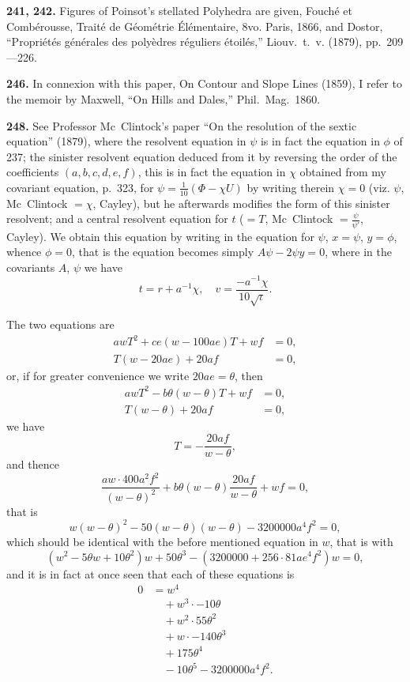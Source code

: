 \documentclass[12pt,a4paper]{article}
\theoremstyle{definition}
\begin{document}
\vspace{0.5em}

\noindent\textbf{241, 242.} Figures of Poinsot's stellated Polyhedra are given, Fouch\'{e} et Comb\'{e}rousse, Trait\'{e} de G\'{e}om\'{e}trie \'{E}l\'{e}mentaire, 8vo. Paris, 1866, and Dostor, ``Propri\'{e}t\'{e}s g\'{e}n\'{e}rales des poly\`{e}dres r\'{e}guliers \'{e}toil\'{e}s,'' Liouv.~t.~v. (1879), pp.~209---226.

\vspace{0.5em}

\noindent\textbf{246.} In connexion with this paper, On Contour and Slope Lines (1859), I refer to the memoir by Maxwell, ``On Hills and Dales,'' Phil.~Mag.~1860.

\vspace{0.5em}

\noindent\textbf{248.} See Professor Mc~Clintock's paper ``On the resolution of the sextic equation'' (1879), where the resolvent equation in $\psi$ is in fact the equation in $\phi$ of 237; the sinister resolvent equation deduced from it by reversing the order of the coefficients $(a, b, c, d, e, f)$, this is in fact the equation in $\chi$ obtained from my covariant equation, p.~323, for $\psi = \frac{1}{10}(\Phi - \chi U)$ by writing therein $\chi = 0$ (viz. $\psi$, Mc~Clintock $= \chi$, Cayley), but he afterwards modifies the form of this sinister resolvent; and a central resolvent equation for $t$ ($= T$, Mc~Clintock $= \frac{\psi}{\psi'}$, Cayley). We obtain this equation by writing in the equation for $\psi$, $x = \psi$, $y = \phi$, whence $\phi = 0$, that is the equation becomes simply $A\psi - 2\psi y = 0$, where in the covariants $A$, $\psi$ we have
\[
t = r + a^{-1}\chi,\quad v = \frac{-a^{-1}\chi}{10\sqrt{\iota}}.
\]

The two equations are
\begin{align*}
awT^2 + ce(w - 100 ae) T + wf &=  0,\\
T(w - 20 ae) + 20 af &= 0,
\end{align*}
or, if for greater convenience we write $20 ae = \theta$, then
\begin{align*}
awT^2 - b\theta(w - \theta)T + wf &= 0,\\
T(w - \theta) + 20af &= 0,
\end{align*}
we have
\[
T = -\frac{20af}{w - \theta},
\]
and thence
\[
\frac{aw \cdot 400 a^2f^2}{(w - \theta)^2} + b\theta(w - \theta)\frac{20af}{w - \theta} + wf = 0,
\]
that is
\[
w(w - \theta)^2 - 50(w - \theta)(w - \theta) - 3200000 a^4f^2 = 0,
\]
which should be identical with the before mentioned equation in $w$, that is with
\[
(w^2 - 5\theta w + 10\theta^2)w + 50\theta^3 - (3200000 + 256\cdot 81 ae^4f^2)w = 0,
\]
and it is in fact at once seen that each of these equations is
\begin{align*}
0 &= w^4 \\
&\quad + w^3 \cdot -10\theta \\
&\quad + w^2 \cdot 55\theta^2 \\
&\quad + w \cdot -140\theta^3 \\
&\quad + 175\theta^4 \\
&\quad - 10\theta^5 - 3200000a^4f^2.
\end{align*}
\end{document}
